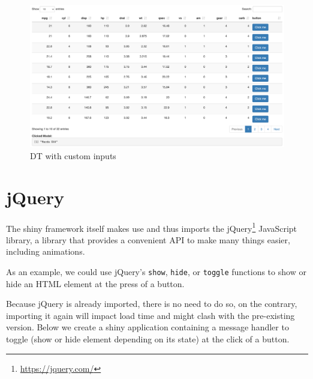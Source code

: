 \documentclass[
]{krantz}
\makeatletter
\newenvironment{Shaded}{\begin{snugshade}}{\end{snugshade}}
\newcommand{\AttributeTok}[1]{\textcolor[rgb]{0.61,0.61,0.61}{#1}}
\newcommand{\CommentTok}[1]{\textcolor[rgb]{0.37,0.37,0.37}{\textit{#1}}}
\newcommand{\NormalTok}[1]{#1}
\newcommand{\OperatorTok}[1]{\textcolor[rgb]{0.43,0.43,0.43}{\textbf{#1}}}
\newcommand{\StringTok}[1]{\textcolor[rgb]{0.5,0.5,0.5}{#1}}
\renewcommand{\href}[2]{#2\footnote{\url{#1}}}
\newenvironment{kframe}{%
\medskip{}
\setlength{\fboxsep}{.8em}
 \def\at@end@of@kframe{}%
 \ifinner\ifhmode%
  \def\at@end@of@kframe{\end{minipage}}%
  \begin{minipage}{\columnwidth}%
 \fi\fi%
 \def\FrameCommand##1{\hskip\@totalleftmargin \hskip-\fboxsep
 \colorbox{shadecolor}{##1}\hskip-\fboxsep
     \hskip-\linewidth \hskip-\@totalleftmargin \hskip\columnwidth}%
 \MakeFramed {\advance\hsize-\width
   \@totalleftmargin\z@ \linewidth\hsize
   \@setminipage}}%
 {\par\unskip\endMakeFramed%
 \at@end@of@kframe}
\renewenvironment{Shaded}{\begin{kframe}}{\end{kframe}}
\makeatother
\begin{document}
\begin{figure}[t]

{\centering \includegraphics[width=1\linewidth]{images/dt-button} 

}

\caption{DT with custom inputs}\label{fig:dt-button}
\end{figure}

\hypertarget{shiny-tips-jQuery}{%
\section{jQuery}\label{shiny-tips-jQuery}}

The shiny framework itself makes use and thus imports the \href{https://jquery.com/}{jQuery} JavaScript library, a library that provides a convenient API to make many things easier, including animations.

As an example, we could use jQuery's \texttt{show}, \texttt{hide}, or \texttt{toggle} functions to show or hide an HTML element at the press of a button.

\begin{Shaded}
\end{Shaded}

Because jQuery is already imported, there is no need to do so, on the contrary, importing it again will impact load time and might clash with the pre-existing version. Below we create a shiny application containing a message handler to toggle (show or hide element depending on its state) at the click of a button.
\end{document}
